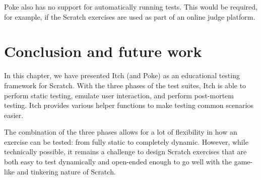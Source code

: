\documentclass[../main]{subfiles}
\begin{document}
Poke also has no support for automatically running tests.
This would be required, for example, if the Scratch exercises are used as part of an online judge platform.

\section{Conclusion and future work}\label{sec:conclusion-and-future-work}

In this chapter, we have presented Itch (and Poke) as an educational testing framework for Scratch.
With the three phases of the test suites, Itch is able to perform static testing, emulate user interaction, and perform post-mortem testing.
Itch provides various helper functions to make testing common scenarios easier.

The combination of the three phases allows for a lot of flexibility in how an exercise can be tested: from fully static to completely dynamic.
However, while technically possible, it remains a challenge to design Scratch exercises that are both easy to test dynamically and open-ended enough to go well with the game-like and tinkering nature of Scratch.
\end{document}
